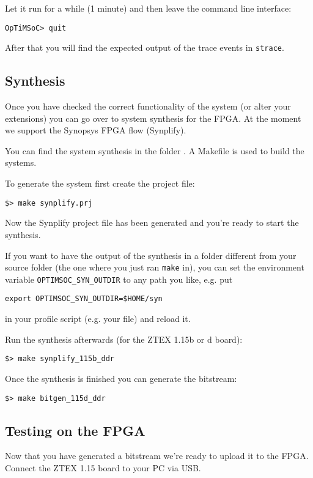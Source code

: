 Let it run for a while (1 minute) and then leave the command line
interface:
\begin{lstlisting}
OpTiMSoC> quit
\end{lstlisting}

After that you will find the expected output of the trace events in
\verb|strace|.

\subsection{Synthesis}

Once you have checked the correct functionality of the system (or
alter your extensions) you can go over to system synthesis for the
FPGA. At the moment we support the Synopsys FPGA flow (Synplify).

You can find the system synthesis in the folder
. A Makefile is used to build the
systems.

To generate the system first create the project file:

\begin{lstlisting}
$> make synplify.prj
\end{lstlisting}

Now the Synplify project file has been generated and you're ready to start the
synthesis.

If you want to have the output of the synthesis in a folder different from your
source folder (the one where you just ran \verb|make| in), you can set the
environment variable \verb|OPTIMSOC_SYN_OUTDIR| to any path you like, e.g. put
\begin{lstlisting}
export OPTIMSOC_SYN_OUTDIR=$HOME/syn
\end{lstlisting}
in your profile script (e.g. your  file) and reload it.

Run the synthesis afterwards (for the ZTEX 1.15b or d board):

\begin{lstlisting}
$> make synplify_115b_ddr
\end{lstlisting}

Once the synthesis is finished you can generate the bitstream:

\begin{lstlisting}
$> make bitgen_115d_ddr
\end{lstlisting}

\subsection{Testing on the FPGA}
Now that you have generated a bitstream we're ready to upload it to the FPGA.
Connect the ZTEX 1.15 board to your PC via USB.

